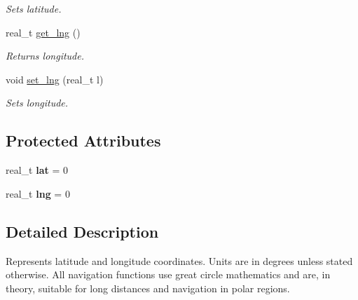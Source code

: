 \begin{DoxyCompactItemize}
\begin{DoxyCompactList}\small\item\em Sets latitude. \end{DoxyCompactList}\item 
\hypertarget{classetk_1_1_coordinate_a88658854589edbbd0e4a062e69475e83}{real\-\_\-t \hyperlink{classetk_1_1_coordinate_a88658854589edbbd0e4a062e69475e83}{get\-\_\-lng} ()}\label{classetk_1_1_coordinate_a88658854589edbbd0e4a062e69475e83}

\begin{DoxyCompactList}\small\item\em Returns longitude. \end{DoxyCompactList}\item 
\hypertarget{classetk_1_1_coordinate_acf9b4c3954120dd08000e8ac3bc8ac91}{void \hyperlink{classetk_1_1_coordinate_acf9b4c3954120dd08000e8ac3bc8ac91}{set\-\_\-lng} (real\-\_\-t l)}\label{classetk_1_1_coordinate_acf9b4c3954120dd08000e8ac3bc8ac91}

\begin{DoxyCompactList}\small\item\em Sets longitude. \end{DoxyCompactList}\end{DoxyCompactItemize}
\subsection*{Protected Attributes}
\begin{DoxyCompactItemize}
\item 
\hypertarget{classetk_1_1_coordinate_ae83bdaa674ce6711e33f87eb3e1e4e46}{real\-\_\-t {\bfseries lat} = 0}\label{classetk_1_1_coordinate_ae83bdaa674ce6711e33f87eb3e1e4e46}

\item 
\hypertarget{classetk_1_1_coordinate_a973ba502e736b0c5a5098d762cf42819}{real\-\_\-t {\bfseries lng} = 0}\label{classetk_1_1_coordinate_a973ba502e736b0c5a5098d762cf42819}

\end{DoxyCompactItemize}


\subsection{Detailed Description}
Represents latitude and longitude coordinates. Units are in degrees unless stated otherwise. All navigation functions use great circle mathematics and are, in theory, suitable for long distances and navigation in polar regions. 

